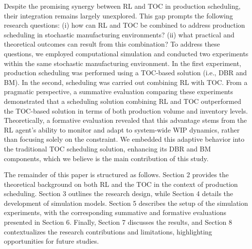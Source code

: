 Despite the promising synergy between RL and TOC in production
scheduling, their integration remains largely unexplored. This gap
prompts the following research questions: (i) how can RL and TOC be
combined to address production scheduling in stochastic manufacturing
environments? (ii) what practical and theoretical outcomes can result
from this combination? To address these questions, we employed
computational simulation and conducted two experiments within the same
stochastic manufacturing environment. In the first experiment,
production scheduling was performed using a TOC-based solution (i.e.,
DBR and BM). In the second, scheduling was carried out combining RL with
TOC. From a pragmatic perspective, a summative evaluation comparing
these experiments demonstrated that a scheduling solution combining RL
and TOC outperformed the TOC-based solution in terms of both production
volume and inventory levels. Theoretically, a formative evaluation
revealed that this advantage stems from the RL agent's ability to
monitor and adapt to system-wide WIP dynamics, rather than focusing
solely on the constraint. We embedded this adaptive behavior into the
traditional TOC scheduling solution, enhancing its DBR and BM
components, which we believe is the main contribution of this study.

The remainder of this paper is structured as follows. Section 2 provides
the theoretical background on both RL and the TOC in the context of
production scheduling. Section 3 outlines the research design, while
Section 4 details the development of simulation models. Section 5
describes the setup of the simulation experiments, with the
corresponding summative and formative evaluations presented in Section
6. Finally, Section 7 discusses the results, and Section 8
contextualizes the research contributions and limitations, highlighting
opportunities for future studies.
